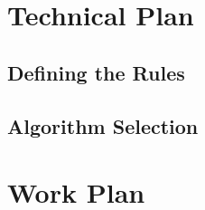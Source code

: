 \documentclass[a4paper, 12pt]{extreport}
\begin{document}
	
	\chapter{Technical Plan}
	
		
		\section{Defining the Rules}
		
		\section{Algorithm Selection}
		
		\section{}
	
	\chapter{Work Plan}
		
	
	\printbibliography[heading={bibnumbered}, title={References}]
		
\end{document}
